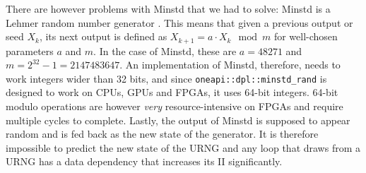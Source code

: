 There are however problems with Minstd that we had to solve: Minstd is a Lehmer random number generator \cite{lehmer1951mathematical}. This means that given a previous output or seed $X_{k}$, its next output is defined as $X_{k+1} = a \cdot X_k \mod m$ for well-chosen parameters $a$ and $m$. In the case of Minstd, these are $a = 48271$ and $m = 2^{32} - 1 = 2147483647$. An implementation of Minstd, therefore, needs to work integers wider than 32 bits, and since \texttt{oneapi::dpl::minstd\_rand} is designed to work on \acp{CPU}, \acp{GPU} and \acp{FPGA}, it uses 64-bit integers. 64-bit modulo operations are however \emph{very} resource-intensive on \acp{FPGA} and require multiple cycles to complete. Lastly, the output of Minstd is supposed to appear random and is fed back as the new state of the generator. It is therefore impossible to predict the new state of the \ac{URNG} and any loop that draws from a \ac{URNG} has a data dependency that increases its \ac{II} significantly.

